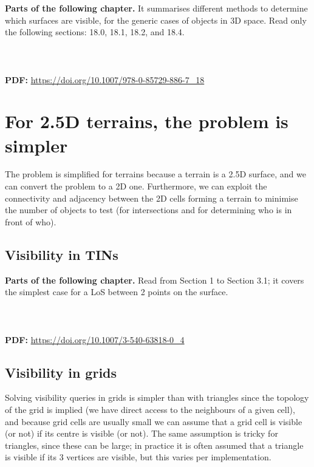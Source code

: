\begin{kaobox}[frametitle=\faExternalLink\ To read or to watch.]
  \textbf{Parts of the following chapter.} It summarises different methods to determine which surfaces are visible, for the generic cases of objects in 3D space.
  Read only the following sections: 18.0, 18.1, 18.2, and 18.4.
  \\ \\
   \\ \\
  \textbf{PDF:} \url{https://doi.org/10.1007/978-0-85729-886-7_18}
\end{kaobox}




%
\section[2.5D terrains are simple]{For 2.5D terrains, the problem is simpler}

The problem is simplified for terrains because a terrain is a 2.5D surface, and we can convert the problem to a 2D one.
Furthermore, we can exploit the connectivity and adjacency between the 2D cells forming a terrain to minimise the number of objects to test (for intersections and for determining who is in front of who).


%
\subsection{Visibility in TINs}

\begin{kaobox}[frametitle=\faExternalLink\ To read or to watch.]
\textbf{Parts of the following chapter.} 
Read from Section 1 to Section 3.1; it covers the simplest case for a LoS between 2 points on the surface.
\\ \\
 \\ \\
\textbf{PDF:} \url{https://doi.org/10.1007/3-540-63818-0_4}
\end{kaobox}


%
\subsection{Visibility in grids}

Solving visibility queries in grids is simpler than with triangles since the topology of the grid is implied (we have direct access to the neighbours of a given cell), and because grid cells are usually small we can assume that a grid cell is visible (or not) if its centre is visible (or not).
The same assumption is tricky for triangles, since these can be large; in practice it is often assumed that a triangle is visible if its 3 vertices are visible, but this varies per implementation.

